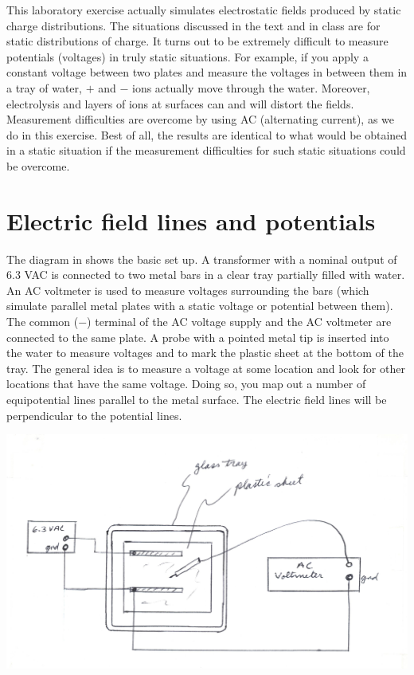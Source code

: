 \begin{multicols}{2}
This laboratory exercise actually simulates electrostatic fields produced by static charge distributions.  The situations discussed in the text and in class are for static distributions of charge.  It turns out to be extremely difficult to measure potentials (voltages) in truly static situations.  For example, if you apply a constant voltage between two plates and measure the voltages in between them in a tray of water, $+$ and $-$ ions actually move through the water.  Moreover, electrolysis and layers of ions at surfaces can and will distort the fields.  Measurement difficulties are overcome by using AC (alternating current), as we do in this exercise.  Best of all, the results are identical to what would be obtained in a static situation if the measurement difficulties for such static situations could be overcome.

\section{Electric field lines and potentials}
The diagram in  shows the basic set up.  A transformer with a nominal output of 6.3 VAC is connected to two metal bars in a clear tray partially filled with water.  An AC voltmeter is used to measure voltages surrounding the bars (which simulate parallel metal plates with a static voltage or potential between them).  The common ($-$) terminal of the AC voltage supply and the AC voltmeter are connected to the same plate.  A probe with a pointed metal tip is inserted into the water to measure voltages and to mark the plastic sheet at the bottom of the tray.  The general idea is to measure a voltage at some location and look for other locations that have the same voltage.  Doing so, you map out a number of equipotential lines parallel to the metal surface. The electric field lines will be perpendicular to the potential lines.

\begin{center}
	\includegraphics[scale=0.5]{5bgraf/fig_1}
	\label{f:fig1}
\end{center}


\end{multicols}

